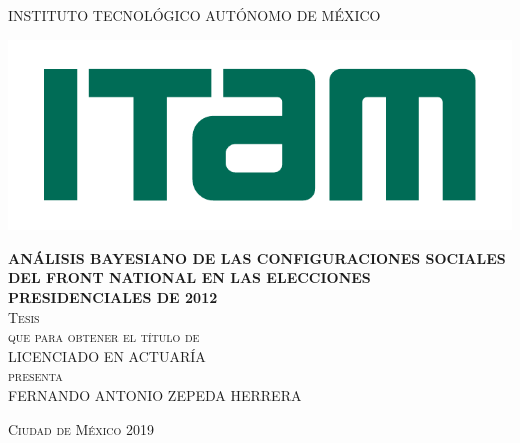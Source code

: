 \begin{titlepage}

\begin{center}

\large{INSTITUTO TECNOLÓGICO AUTÓNOMO DE MÉXICO}\\

\begin{center}
	\includegraphics[scale=0.8]{Figs/logo-ITAM.pdf}
\end{center}

\textsc{\large \textbf{ANÁLISIS BAYESIANO DE LAS CONFIGURACIONES SOCIALES DEL FRONT NATIONAL EN LAS ELECCIONES PRESIDENCIALES DE 2012}}\\[2em]

\textsc{\large Tesis}\\[1em]

\textsc{que para obtener el título de}\\[1em]

\textsc{LICENCIADO EN ACTUARÍA}\\[1em]

\textsc{presenta}\\[1em]

\textsc{\Large FERNANDO ANTONIO ZEPEDA HERRERA}\\[1em]

\end{center}

\vspace*{\fill}
\textsc{Ciudad de México \hspace*{\fill} 2019}

\end{titlepage}
